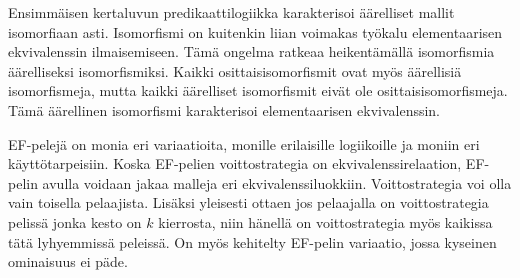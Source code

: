 \documentclass[finnish]{tktltiki2}
\theoremstyle{definition}
\theoremstyle{remark}
\begin{document}
Ensimmäisen kertaluvun predikaattilogiikka karakterisoi äärelliset mallit isomorfiaan asti. Isomorfismi on kuitenkin liian voimakas työkalu elementaarisen ekvivalenssin ilmaisemiseen. Tämä ongelma ratkeaa heikentämällä isomorfismia äärelliseksi isomorfismiksi. Kaikki osittaisisomorfismit ovat myös äärellisiä isomorfismeja, mutta kaikki äärelliset isomorfismit eivät ole osittaisisomorfismeja. Tämä äärellinen isomorfismi karakterisoi elementaarisen ekvivalenssin.

EF-pelejä on monia eri variaatioita, monille erilaisille logiikoille ja moniin eri käyttötarpeisiin. Koska EF-pelien voittostrategia on ekvivalenssirelaation, EF-pelin avulla voidaan jakaa malleja eri ekvivalenssiluokkiin. Voittostrategia voi olla vain toisella pelaajista. Lisäksi yleisesti ottaen jos pelaajalla on voittostrategia pelissä jonka kesto on $k$ kierrosta, niin hänellä on voittostrategia myös kaikissa tätä lyhyemmissä peleissä. On myös kehitelty EF-pelin variaatio, jossa kyseinen ominaisuus ei päde.






 
\newpage
%
%
%
%







% 
\end{document}
